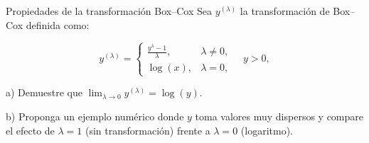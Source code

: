 \documentclass[a4paper,11pt]{article}
\begin{document}
\newpage
\begin{ejercicio}{11}
    Propiedades de la transformación Box--Cox
    Sea $y^{(\lambda)}$ la transformación de Box--Cox definida como:

    \[
        y^{(\lambda)} =
        \begin{cases}
            \frac{y^\lambda - 1}{\lambda}, & \lambda \neq 0, \\
            \log(x),                       & \lambda = 0,
        \end{cases} \quad y>0,
    \]

    a) Demuestre que $\lim_{\lambda\to 0} y^{(\lambda)} = \log(y)$.

    b) Proponga un ejemplo numérico donde $y$ toma valores muy dispersos y compare el efecto de $\lambda=1$ (sin transformación) frente a $\lambda=0$ (logaritmo).
\end{ejercicio}
\end{document}
